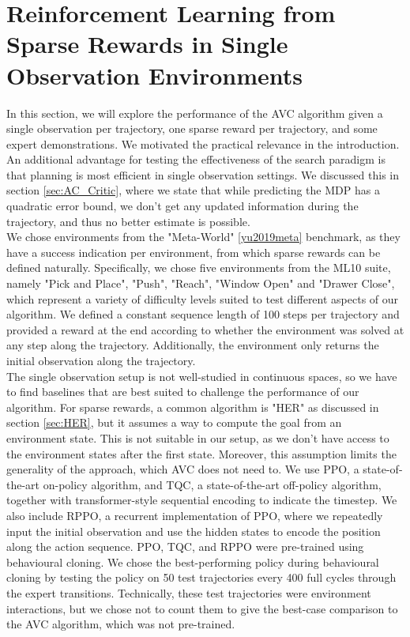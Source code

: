 \section{Reinforcement Learning from Sparse Rewards in Single Observation Environments}
In this section, we will explore the performance of the AVC algorithm given a single observation per trajectory, one sparse reward per trajectory, and some expert demonstrations.
We motivated the practical relevance in the introduction. An additional advantage for testing the effectiveness of the search paradigm is that planning is most efficient in
single observation settings.
We discussed this in section \ref{sec:AC_Critic}, where we state that while predicting the MDP has a quadratic error bound, we don't get any updated information
during the trajectory, and thus no better estimate is possible. \\

We chose environments from the "Meta-World" \ref{yu2019meta} benchmark, as they have a success indication per environment, from which sparse rewards can be defined naturally.
Specifically, we chose five environments from the ML10 suite, namely "Pick and Place", "Push", "Reach", "Window Open" and "Drawer Close", which represent a variety
of difficulty levels suited to test different aspects of our algorithm. We defined a constant sequence length of 100 steps per trajectory and provided
a reward at the end according to whether the environment was solved at any step along the trajectory. Additionally, the environment
only returns the initial observation along the trajectory.\\

The single observation setup is not well-studied in continuous spaces, so we have to find baselines that are best suited to challenge the performance of our algorithm. For sparse rewards, a common
algorithm is "HER" as discussed in section \ref{sec:HER}, but it assumes a way to compute the goal from an environment state. This is not suitable in our setup, as we don't have access to the environment
states after the first state. Moreover, this assumption limits the generality of the approach, which AVC does not need to.
We use PPO, a state-of-the-art on-policy algorithm, and TQC, a state-of-the-art off-policy algorithm, together with transformer-style sequential encoding to indicate the timestep. We also include
RPPO, a recurrent implementation of PPO, where we repeatedly input the initial observation and use the hidden states to encode the position along the action sequence.
PPO, TQC, and RPPO were pre-trained using behavioural cloning. We chose the best-performing policy during behavioural cloning by testing the policy on 50 test
trajectories every 400 full cycles through the
expert transitions. Technically, these test trajectories were environment interactions, but we chose not to count them to give the best-case comparison to the AVC algorithm, which was not pre-trained.\

